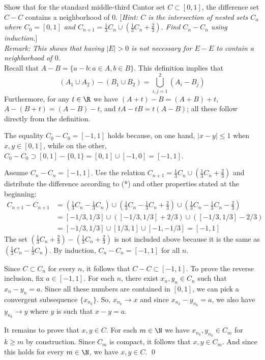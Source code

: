 \begin{hwsol}
Show that for the standard middle-third Cantor set $C \subset [0, 1]$, the difference set $C-C$ contains a neighborhood of $0$. [\emph{Hint: $C$ is the intersection of nested sets $C_n$ where $C_0=[0, 1]$  and $C_{n+1}= \frac13C_n \cup (\frac13 C_n+\frac23)$. Find $C_n-C_n$ using induction.}] \\

\noindent\emph{Remark: This shows that having $|E|>0$ is not necessary for $E-E$ to contain a neighborhood of $0$.} \\

\pf Recall that $A-B = \{a-b\colon a\in A, b\in B\}$. This definition implies that 
	\[
        (A_1 \cup A_2) - (B_1 \cup B_2)= \bigcup_{i, j=1}^2 (A_i - B_j) \tag{*}
	\]
Furthermore, for any  $t \in \R$ we have $(A+t) - B = (A+B)+ t$, $A-(B+t)= (A-B) - t$, and $tA - tB = t(A-B)$; all these follow directly from the definition. 

The equality $C_0 - C_0= [-1, 1]$ holds because, on one hand, $|x-y| \leq 1$ when $x, y\in [0, 1]$, while on the other, $C_0-C_0 \supset [0, 1] -\{0, 1\}= [0, 1] \cup [-1, 0]= [-1, 1]$.  

Assume $C_n - C_n = [-1, 1]$. Use the relation $C_{n+1}= \frac13C_n \cup (\frac13 C_n+\frac23)$ and distribute the difference according to (*) and other properties stated at the beginning:  
        \[
        \begin{split}
        C_{n+1} - C_{n+1}&= \left( \frac13C_n - \frac13C_n \right) \cup \left( \frac13C_n-\frac13C_n + \frac23\right)\cup \left( \frac13C_n-\frac13C_n - \frac23\right) \\ 
        &= [-1/3, 1/3] \cup ([-1/3, 1/3] + 2/3) \cup ([-1/3, 1/3] - 2/3) \\ 
        &= [-1/3, 1/3] \cup [1/3, 1] \cup  [-1 , -1/3] = [-1, 1] 
        \end{split}
        \]
The set $\left( \frac13C_n + \frac23\right)- \left(\frac13C_n +\frac23 \right)$ is not included above because it is the same as $\left( \frac13C_n-\frac13C_n \right)$. By induction, $C_n-C_n=[-1, 1]$ for all $n$. 

Since $C \subset C_n$ for every $n$, it follows that $C - C\subset [-1, 1]$. To prove the reverse inclusion, fix $a \in [-1, 1]$. For each $n$, there exist $x_n, y_n \in C_n$ such that $x_n - y_n= a$. Since all these numbers are contained in $[0, 1]$, we can pick a convergent subsequence  $\{ x_{n_k} \}$. So, $x_{n_k}\to x$ and since $x_{n_k} - y_{n_k}= a$, we also have $y_{n_k} \to y$ where $y$ is such that $x - y=a$.  

It remains to prove that $x, y \in C$. For each $m \in \N$ we have $x_{n_k}, y_{n_k} \in C_m$ for $k \geq m$ by construction. Since $C_m$ is compact, it follows that $x, y \in C_m$.  And since this holds for every $m \in \N$, we have $x, y \in C$. \qed \\
\end{hwsol}


